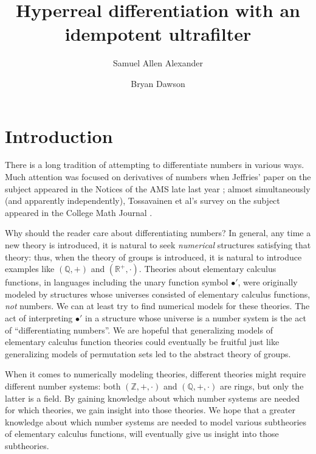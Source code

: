 \documentclass[microtype]{jloganal}
\title[Hyperreal differentiation with an idempotent ultrafilter]{Hyperreal differentiation with an idempotent ultrafilter}
\author[S\,A Alexander]{Samuel Allen Alexander}
\author[B Dawson]{Bryan Dawson}
\begin{document}
\maketitle

\section{Introduction}

There is a long tradition
\cite{shelly1911cuestion,barbeau1961remarks,ufnarovski2003differentiate,
buium2005arithmetic,stay2005generalized,kovic2012arithmetic,buium2015differential,pasten2022arithmetic,buium2023foundations} of attempting to differentiate numbers in various ways.
Much attention was focused on derivatives of numbers when Jeffries'
paper on the subject appeared in the Notices of the
AMS late last year \cite{jeffries1772differentiating}; almost simultaneously
(and apparently independently),
Tossavainen et al's survey on the subject appeared in the College Math Journal
\cite{tossavainen2024we}.

Why should the reader care about differentiating numbers?
In general, any time a new theory is introduced, it is natural to seek
\emph{numerical} structures satisfying that theory: thus, when the theory of groups
is introduced, it is natural to introduce examples like $(\mathbb Q,+)$
and $(\mathbb R^+,\cdot)$.
Theories about elementary calculus functions, in languages
including the unary function symbol $\bullet'$, were originally modeled
by structures whose universes consisted of elementary calculus functions,
\emph{not} numbers. We can at least try to find numerical models for these
theories. The act of interpreting
$\bullet'$ in a structure whose universe is a number system
is the act of ``differentiating numbers''. We are hopeful that
generalizing models of elementary calculus function theories could eventually
be fruitful just like generalizing models of permutation sets led to
the abstract theory of groups.

When it comes to numerically modeling theories,
different theories might require different
number systems: both $(\mathbb Z,+,\cdot)$ and $(\mathbb Q,+,\cdot)$
are rings, but only the latter is a field.
By gaining knowledge about which number systems are needed for which theories,
we gain insight into those theories. We hope that a greater
knowledge about which number systems are needed to model various subtheories of
elementary calculus functions, will eventually give us insight into
those subtheories.
\end{document}
